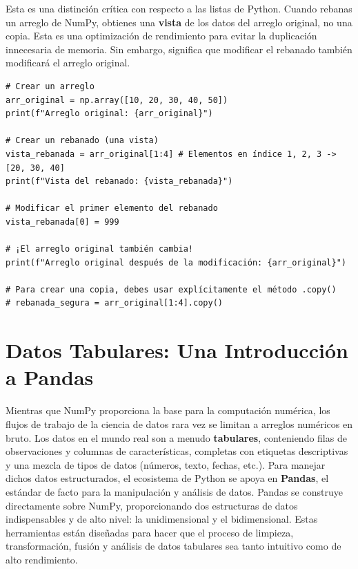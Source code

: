 \begin{remark}
Esta es una distinción crítica con respecto a las listas de Python. Cuando rebanas un arreglo de NumPy, obtienes una \textbf{vista} de los datos del arreglo original, no una copia. Esta es una optimización de rendimiento para evitar la duplicación innecesaria de memoria. Sin embargo, significa que modificar el rebanado también modificará el arreglo original.
\text{ }\begin{verbatim}
# Crear un arreglo
arr_original = np.array([10, 20, 30, 40, 50])
print(f"Arreglo original: {arr_original}")

# Crear un rebanado (una vista)
vista_rebanada = arr_original[1:4] # Elementos en índice 1, 2, 3 -> [20, 30, 40]
print(f"Vista del rebanado: {vista_rebanada}")

# Modificar el primer elemento del rebanado
vista_rebanada[0] = 999

# ¡El arreglo original también cambia!
print(f"Arreglo original después de la modificación: {arr_original}")

# Para crear una copia, debes usar explícitamente el método .copy()
# rebanada_segura = arr_original[1:4].copy()
\end{verbatim}
\end{remark}

\section{Datos Tabulares: Una Introducción a Pandas}
\label{sec:pandas_intro}
Mientras que NumPy proporciona la base para la computación numérica, los flujos de trabajo de la ciencia de datos rara vez se limitan a arreglos numéricos en bruto. Los datos en el mundo real son a menudo \textbf{tabulares}, conteniendo filas de observaciones y columnas de características, completas con etiquetas descriptivas y una mezcla de tipos de datos (números, texto, fechas, etc.). Para manejar dichos datos estructurados, el ecosistema de Python se apoya en \textbf{Pandas}, el estándar de facto para la manipulación y análisis de datos. Pandas se construye directamente sobre NumPy, proporcionando dos estructuras de datos indispensables y de alto nivel: la \textbf{} unidimensional y el \textbf{} bidimensional. Estas herramientas están diseñadas para hacer que el proceso de limpieza, transformación, fusión y análisis de datos tabulares sea tanto intuitivo como de alto rendimiento.


